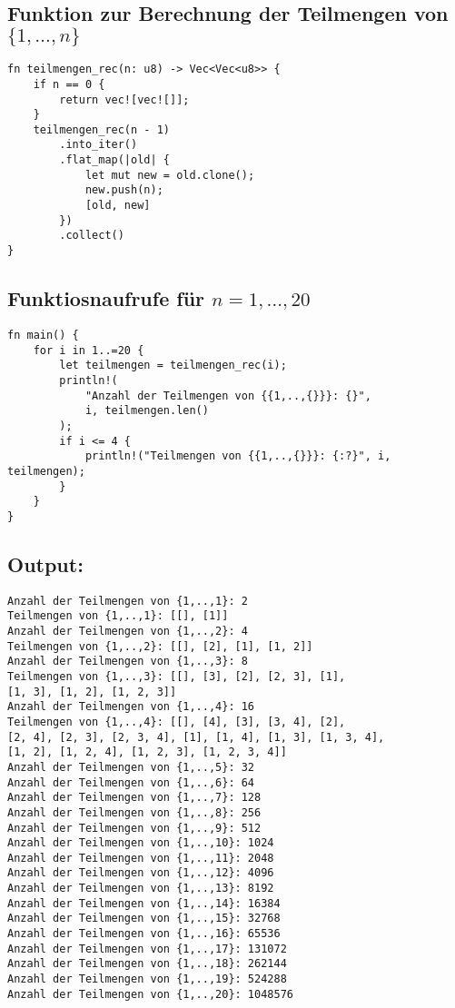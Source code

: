 \documentclass[a4paper]{scrartcl}
\begin{document}
\subsection*{Funktion zur Berechnung der Teilmengen von $\{1, \ldots, n\}$}
\begin{lstlisting}
fn teilmengen_rec(n: u8) -> Vec<Vec<u8>> {
    if n == 0 {
        return vec![vec![]];
    } 
    teilmengen_rec(n - 1)
        .into_iter()
        .flat_map(|old| {
            let mut new = old.clone();
            new.push(n);
            [old, new]
        })
        .collect()
}
\end{lstlisting}

\subsection*{Funktiosnaufrufe für $n = 1, \ldots, 20$}
\begin{lstlisting}
fn main() {
    for i in 1..=20 {
        let teilmengen = teilmengen_rec(i);
        println!(
            "Anzahl der Teilmengen von {{1,..,{}}}: {}", 
            i, teilmengen.len()
        );
        if i <= 4 {
            println!("Teilmengen von {{1,..,{}}}: {:?}", i, teilmengen);
        }
    }  
}
\end{lstlisting}

\newpage
\subsection*{Output:}
\begin{lstlisting}
Anzahl der Teilmengen von {1,..,1}: 2
Teilmengen von {1,..,1}: [[], [1]]
Anzahl der Teilmengen von {1,..,2}: 4
Teilmengen von {1,..,2}: [[], [2], [1], [1, 2]]
Anzahl der Teilmengen von {1,..,3}: 8
Teilmengen von {1,..,3}: [[], [3], [2], [2, 3], [1], 
[1, 3], [1, 2], [1, 2, 3]]
Anzahl der Teilmengen von {1,..,4}: 16
Teilmengen von {1,..,4}: [[], [4], [3], [3, 4], [2], 
[2, 4], [2, 3], [2, 3, 4], [1], [1, 4], [1, 3], [1, 3, 4], 
[1, 2], [1, 2, 4], [1, 2, 3], [1, 2, 3, 4]]
Anzahl der Teilmengen von {1,..,5}: 32
Anzahl der Teilmengen von {1,..,6}: 64
Anzahl der Teilmengen von {1,..,7}: 128
Anzahl der Teilmengen von {1,..,8}: 256
Anzahl der Teilmengen von {1,..,9}: 512
Anzahl der Teilmengen von {1,..,10}: 1024
Anzahl der Teilmengen von {1,..,11}: 2048
Anzahl der Teilmengen von {1,..,12}: 4096
Anzahl der Teilmengen von {1,..,13}: 8192
Anzahl der Teilmengen von {1,..,14}: 16384
Anzahl der Teilmengen von {1,..,15}: 32768
Anzahl der Teilmengen von {1,..,16}: 65536
Anzahl der Teilmengen von {1,..,17}: 131072
Anzahl der Teilmengen von {1,..,18}: 262144
Anzahl der Teilmengen von {1,..,19}: 524288
Anzahl der Teilmengen von {1,..,20}: 1048576
\end{lstlisting}
\end{document}

